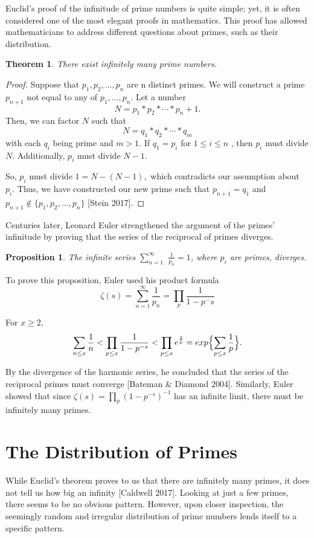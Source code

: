 \documentclass[11pt]{article}
\newtheorem{thm}{Theorem}[section]
\newtheorem{prop}{Proposition}[section]
\begin{document}
Euclid's proof of the infinitude of prime numbers is quite simple; yet, it is often considered one of the most elegant proofs in mathematics. This proof has allowed mathematicians to address different questions about primes, such as their distribution.

\begin{thm}
There exist infinitely many prime numbers.
\end{thm}
\begin{proof}
Suppose that $p_1, p_2, \ldots , p_n$ are n distinct primes. We will construct a prime $p_{n+1}$ not equal to any of $p_1, \ldots , p_n.$ Let a number $$N = p_1*p_2*\cdots*p_n+1.$$ Then, we can factor $N$ such that $$N = q_1*q_2*\cdots*q_m$$ with each $q_i$ being prime and $m > 1.$ If $q_1 = p_i$ for $1 \leq i \leq n$ , then $p_i$ must divide $N.$ Additionally, $p_i$ must divide $N-1.$

So, $p_i$ must divide $1 = N - (N - 1),$ which contradicts our assumption about $p_i.$ Thus, we have constructed our new prime such that $p_{n+1} = q_1$ and $p_{n+1} \notin \{p_1, p_2, \ldots , p_n\}$ [Stein 2017].
\end{proof}

Centuries later, Leonard Euler strengthened the argument of the primes' infinitude by proving that the series of the reciprocal of primes diverges.

\begin{prop} 
The infinite series $\sum_{n=1}^{\infty}$ \(\frac{1}{p_n}\)$ = 1$, where $p_i$ are primes, diverges. 
\end{prop}

To prove this proposition, Euler used his product formula
\begin{equation}  
\zeta(s) = \sum_{n=1}^{\infty}\frac{1}{p_n} = \prod_{p}^{}\frac{1}{1 - p^-s} 
\end{equation}

For $x \geq 2,$
$$\sum_{n \leq x}^{}\frac{1}{n} < 
\prod_{p \leq x}^{}\frac{1}{1 - p^{-s}} < 
\prod_{p \leq x}^{}e^{\frac{2}{p}} = 
exp \Bigl\{\sum_{p \leq x}^{}\frac{1}{p}\Bigr\}.$$

By the divergence of the harmonic series, he concluded that the series of the reciprocal primes must converge [Bateman \& Diamond 2004]. Similarly, Euler showed that since $\zeta(s) = \prod_{p}^{}(1 - p^{-s})^{-1}$ has an infinite limit, there must be infinitely many primes.

\section{The Distribution of Primes} 
While Euclid's theorem proves to us that there are infinitely many primes, it does not tell us how big an infinity [Caldwell 2017]. Looking at just a few primes, there seems to be no obvious pattern. However, upon closer inspection, the seemingly random and irregular distribution of prime numbers lends itself to a specific pattern.
\end{document}
